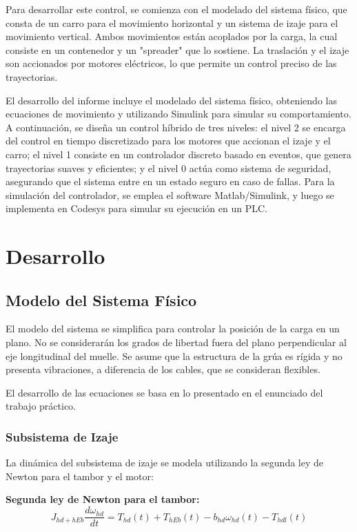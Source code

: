 \documentclass{article}
\begin{document}
Para desarrollar este control, se comienza con el modelado del sistema físico, que consta de un carro para el movimiento horizontal y un sistema de izaje para el movimiento vertical. Ambos movimientos están acoplados por la carga, la cual consiste en un contenedor y un "spreader" que lo sostiene. La traslación y el izaje son accionados por motores eléctricos, lo que permite un control preciso de las trayectorias.

El desarrollo del informe incluye el modelado del sistema físico, obteniendo las ecuaciones de movimiento y utilizando Simulink para simular su comportamiento. A continuación, se diseña un control híbrido de tres niveles: el nivel 2 se encarga del control en tiempo discretizado para los motores que accionan el izaje y el carro; el nivel 1 consiste en un controlador discreto basado en eventos, que genera trayectorias suaves y eficientes; y el nivel 0 actúa como sistema de seguridad, asegurando que el sistema entre en un estado seguro en caso de fallas. Para la simulación del controlador, se emplea el software Matlab/Simulink, y luego se implementa en Codesys para simular su ejecución en un PLC.


\section{Desarrollo} \label{sec:desarrollo}
    \subsection{Modelo del Sistema Físico} \label{sec:plantModel}

        El modelo del sistema se simplifica para controlar la posición de la carga en un plano. No se considerarán los grados de libertad fuera del plano perpendicular al eje longitudinal del muelle. Se asume que la estructura de la grúa es rígida y no presenta vibraciones, a diferencia de los cables, que se consideran flexibles.

        El desarrollo de las ecuaciones se basa en lo presentado en el enunciado del trabajo práctico.
    
        
        \subsubsection{Subsistema de Izaje}
            La dinámica del subsistema de izaje se modela utilizando la segunda ley de Newton para el tambor y el motor:

            \textbf{Segunda ley de Newton para el tambor:}
            \begin{equation} \label{eq:tamborIzaje}
                J_{hd+hEb} \frac{d \omega_{hd}}{dt} = T_{hd}(t) + T_{hEb}(t) - b_{hd} \omega_{hd}(t) - T_{hdl}(t)
            \end{equation}
\end{document}
